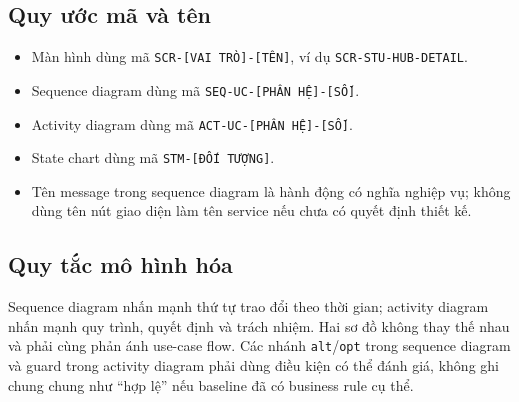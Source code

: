 \subsection{Quy ước mã và tên}

\begin{itemize}
  \item Màn hình dùng mã \texttt{SCR-[VAI TRÒ]-[TÊN]}, ví dụ \texttt{SCR-STU-HUB-DETAIL}.
  \item Sequence diagram dùng mã \texttt{SEQ-UC-[PHÂN HỆ]-[SỐ]}.
  \item Activity diagram dùng mã \texttt{ACT-UC-[PHÂN HỆ]-[SỐ]}.
  \item State chart dùng mã \texttt{STM-[ĐỐI TƯỢNG]}.
  \item Tên message trong sequence diagram là hành động có nghĩa nghiệp vụ; không dùng tên nút giao diện làm tên service nếu chưa có quyết định thiết kế.
\end{itemize}

\subsection{Quy tắc mô hình hóa}

Sequence diagram nhấn mạnh thứ tự trao đổi theo thời gian; activity diagram nhấn mạnh quy trình, quyết định và trách nhiệm. Hai sơ đồ không thay thế nhau và phải cùng phản ánh use-case flow. Các nhánh \texttt{alt}/\texttt{opt} trong sequence diagram và guard trong activity diagram phải dùng điều kiện có thể đánh giá, không ghi chung chung như ``hợp lệ'' nếu baseline đã có business rule cụ thể.
